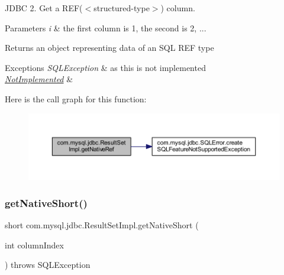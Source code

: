 J\+D\+BC 2. Get a R\+EF($<$structured-\/type$>$) column.


\begin{DoxyParams}{Parameters}
{\em i} & the first column is 1, the second is 2, ...\\
\hline
\end{DoxyParams}
\begin{DoxyReturn}{Returns}
an object representing data of an S\+QL R\+EF type
\end{DoxyReturn}

\begin{DoxyExceptions}{Exceptions}
{\em S\+Q\+L\+Exception} & as this is not implemented \\
\hline
{\em \mbox{\hyperlink{classcom_1_1mysql_1_1jdbc_1_1_not_implemented}{Not\+Implemented}}} & \\
\hline
\end{DoxyExceptions}
Here is the call graph for this function\+:
\nopagebreak
\begin{figure}[H]
\begin{center}
\leavevmode
\includegraphics[width=350pt]{classcom_1_1mysql_1_1jdbc_1_1_result_set_impl_ad943614b8eb9828bacf207844265f8b5_cgraph}
\end{center}
\end{figure}
\mbox{\label{classcom_1_1mysql_1_1jdbc_1_1_result_set_impl_a0825e2c600b9bdc3bd1748a7c4f182f7}} 
\subsubsection{\texorpdfstring{get\+Native\+Short()}{getNativeShort()}}
{\footnotesize\ttfamily short com.\+mysql.\+jdbc.\+Result\+Set\+Impl.\+get\+Native\+Short (\begin{DoxyParamCaption}\item[{int}]{column\+Index }\end{DoxyParamCaption}) throws S\+Q\+L\+Exception\hspace{0.3cm}{\ttfamily [protected]}}

